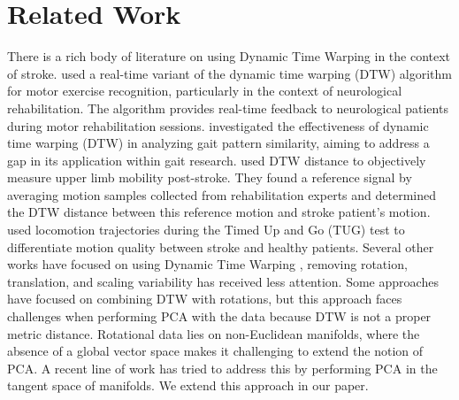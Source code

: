\documentclass{article}
\newcommand{\shashwat}[1]{\textcolor{blue}{shashwat: #1 \\}}
\begin{document}
\section{Related Work}
There is a rich body of literature on using Dynamic Time Warping in the context of stroke. 
\cite{tormene2009matching} used a real-time variant of the dynamic time warping (DTW) algorithm for motor exercise recognition, particularly in the context of neurological rehabilitation. The algorithm provides real-time feedback to neurological patients during motor rehabilitation sessions. \cite{lee2019application} investigated the effectiveness of dynamic time warping (DTW) in analyzing gait pattern similarity, aiming to address a gap in its application within gait research. \cite{Zhang2016Objective} used DTW distance to objectively measure upper limb mobility post-stroke. They found a reference signal by averaging motion samples collected from rehabilitation experts and determined the DTW distance between this reference motion and stroke patient's motion. \cite{Bonnyaud2020Locomotor} used locomotion trajectories during the Timed Up and Go (TUG) test to differentiate motion quality between stroke and healthy patients. Several other works have focused on using Dynamic Time Warping \cite{chakraborty2020functional,kashi2020machine,li2023stiff,Zhang2016Objective}, removing rotation, translation, and scaling variability has received less attention. Some approaches have focused on combining DTW with rotations, but this approach faces challenges when performing PCA with the data because DTW is not a proper metric distance. Rotational data lies on non-Euclidean manifolds, where the absence of a global vector space makes it challenging to extend the notion of PCA. A recent line of work \cite{amor2015action,hosni20183d} has tried to address this by performing PCA in the tangent space of manifolds. We extend this approach in our paper.




\end{document}
